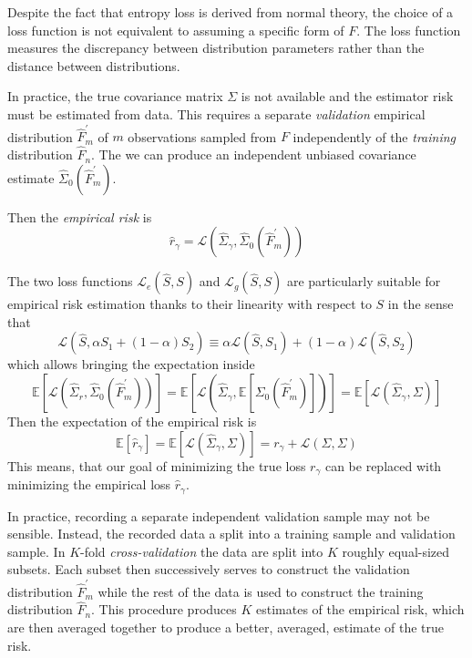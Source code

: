 Despite the fact that entropy loss is derived from normal theory, the choice of a loss function is not equivalent to assuming a specific form of $F$. The loss function measures the discrepancy between distribution parameters rather than the distance between distributions.  

In practice, the true covariance matrix $\Sigma$ is not available and the estimator risk must be estimated from data. This requires a separate \emph{validation} empirical distribution $\hat F_m^\prime$ of $m$ observations sampled from $F$ independently of the \emph{training} distribution $\hat F_n$. The we can produce an independent unbiased covariance estimate $\hat \Sigma_0(\hat F_m^\prime)$.

Then the \emph{empirical risk} is 
\begin{equation}
\hat r_\gamma = \mathcal L\left(\hat\Sigma_\gamma,\hat\Sigma_0(\hat F_m^\prime)\right) 
\end{equation}

 The two loss functions $\mathcal L_e(\hat S,S)$ and $\mathcal L_g(\hat S,S)$ are particularly suitable for empirical risk estimation thanks to their linearity with respect to $S$ in the sense that 
\begin{equation}
\mathcal L\left(\hat S,\alpha S_1 + (1-\alpha)S_2\right) 
\equiv 
\alpha\mathcal L(\hat S,S_1) + (1-\alpha)\mathcal L(\hat S,S_2)
\end{equation}
which allows bringing the expectation inside 
\begin{equation}
\mathbb E\left[ \mathcal L\left(\hat\Sigma_r, \hat\Sigma_0(\hat F_m^\prime)\right) \right] 
=
\mathbb E\left[ \mathcal L\left(\hat\Sigma_\gamma, \mathbb E\left[\Sigma_0(\hat F_m^\prime)\right]\right) \right] 
=
\mathbb E\left[ \mathcal L\left(\hat\Sigma_\gamma, \Sigma\right) \right] 
\end{equation}
Then the expectation of the empirical risk is 
\begin{equation}
\mathbb E\left[\hat r_\gamma\right] 
= \mathbb E\left[\mathcal L(\hat\Sigma_\gamma,\Sigma)\right]
= r_\gamma + \mathcal L(\Sigma,\Sigma)
\end{equation}
This means, that our goal of minimizing the true loss $r_\gamma$ can be replaced with minimizing  the empirical loss $\hat r_\gamma$.

In practice, recording a separate independent validation sample may not be sensible.  Instead, the recorded data a split into a training sample and validation sample. In $K$-fold \emph{cross-validation} the data are split into $K$ roughly equal-sized subsets. Each subset then successively serves to construct the validation distribution $\hat F_m^\prime$  while the rest of the data is used to construct the training distribution $\hat F_n$.  This procedure produces $K$ estimates of the empirical risk, which are then averaged together to produce a better, averaged, estimate of the true risk.

